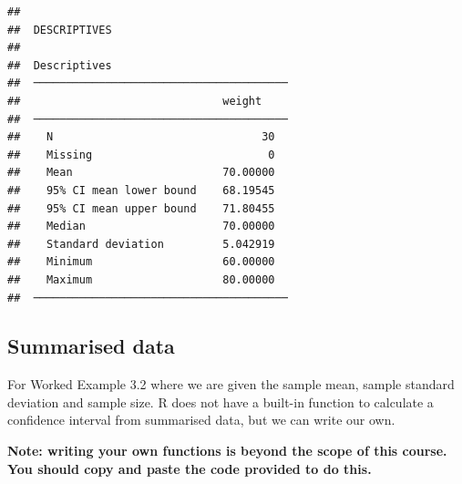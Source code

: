 \documentclass[
]{memoir}
\begin{document}
\begin{verbatim}
## 
##  DESCRIPTIVES
## 
##  Descriptives                            
##  ─────────────────────────────────────── 
##                               weight     
##  ─────────────────────────────────────── 
##    N                                30   
##    Missing                           0   
##    Mean                       70.00000   
##    95% CI mean lower bound    68.19545   
##    95% CI mean upper bound    71.80455   
##    Median                     70.00000   
##    Standard deviation         5.042919   
##    Minimum                    60.00000   
##    Maximum                    80.00000   
##  ───────────────────────────────────────
\end{verbatim}

\hypertarget{summarised-data}{%
\subsection{Summarised data}\label{summarised-data}}

For Worked Example 3.2 where we are given the sample mean, sample standard deviation and sample size. R does not have a built-in function to calculate a confidence interval from summarised data, but we can write our own.

\textbf{Note: writing your own functions is beyond the scope of this course. You should copy and paste the code provided to do this.}
\end{document}
